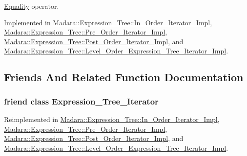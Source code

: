 \hyperlink{classMadara_1_1Expression__Tree_1_1Equality}{Equality} operator. 



Implemented in \hyperlink{classMadara_1_1Expression__Tree_1_1In__Order__Iterator__Impl_a1e657bec8a6663a72eb592486cd73385}{Madara::Expression\_\-Tree::In\_\-Order\_\-Iterator\_\-Impl}, \hyperlink{classMadara_1_1Expression__Tree_1_1Pre__Order__Iterator__Impl_a347e2ceae6e2c8522fd1c22906aa3088}{Madara::Expression\_\-Tree::Pre\_\-Order\_\-Iterator\_\-Impl}, \hyperlink{classMadara_1_1Expression__Tree_1_1Post__Order__Iterator__Impl_af1a79aa4f92fd93c9c549e3628bb3b45}{Madara::Expression\_\-Tree::Post\_\-Order\_\-Iterator\_\-Impl}, and \hyperlink{classMadara_1_1Expression__Tree_1_1Level__Order__Expression__Tree__Iterator__Impl_a708123e4025c43591e4b99c59803a4f3}{Madara::Expression\_\-Tree::Level\_\-Order\_\-Expression\_\-Tree\_\-Iterator\_\-Impl}.



\subsection{Friends And Related Function Documentation}
\hypertarget{classMadara_1_1Expression__Tree_1_1Expression__Tree__Iterator__Impl_adfe8d209b4dd64ac100d4c9c9adf08c1}{
\subsubsection[{Expression\_\-Tree\_\-Iterator}]{\setlength{\rightskip}{0pt plus 5cm}friend class {\bf Expression\_\-Tree\_\-Iterator}}}
\label{d0/dd7/classMadara_1_1Expression__Tree_1_1Expression__Tree__Iterator__Impl_adfe8d209b4dd64ac100d4c9c9adf08c1}


Reimplemented in \hyperlink{classMadara_1_1Expression__Tree_1_1In__Order__Iterator__Impl_adfe8d209b4dd64ac100d4c9c9adf08c1}{Madara::Expression\_\-Tree::In\_\-Order\_\-Iterator\_\-Impl}, \hyperlink{classMadara_1_1Expression__Tree_1_1Pre__Order__Iterator__Impl_adfe8d209b4dd64ac100d4c9c9adf08c1}{Madara::Expression\_\-Tree::Pre\_\-Order\_\-Iterator\_\-Impl}, \hyperlink{classMadara_1_1Expression__Tree_1_1Post__Order__Iterator__Impl_adfe8d209b4dd64ac100d4c9c9adf08c1}{Madara::Expression\_\-Tree::Post\_\-Order\_\-Iterator\_\-Impl}, and \hyperlink{classMadara_1_1Expression__Tree_1_1Level__Order__Expression__Tree__Iterator__Impl_adfe8d209b4dd64ac100d4c9c9adf08c1}{Madara::Expression\_\-Tree::Level\_\-Order\_\-Expression\_\-Tree\_\-Iterator\_\-Impl}.



